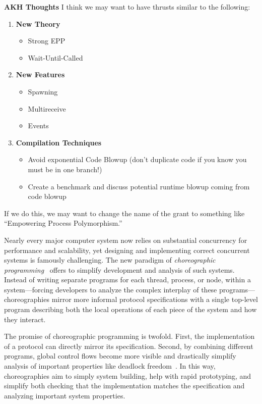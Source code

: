\noindent\textbf{AKH Thoughts}
I think we may want to have thrusts similar to the following:
\begin{enumerate}
\item \textbf{New Theory}
  \begin{itemize}
  \item Strong EPP
  \item Wait-Until-Called
  \end{itemize}
\item \textbf{New Features}
  \begin{itemize}
  \item Spawning
  \item Multireceive 
  \item Events
  \end{itemize}
\item \textbf{Compilation Techniques}
  \begin{itemize}
  \item Avoid exponential Code Blowup (don't duplicate code if you know you must be in one branch!)
  \item Create a benchmark and discuss potential runtime blowup coming from code blowup
  \end{itemize}
\end{enumerate}

If we do this, we may want to change the name of the grant to something like ``Empowering Process Polymorphism.''

\vspace{05em}

Nearly every major computer system now relies on substantial concurrency for performance and scalability,
yet designing and implementing correct concurrent systems is famously challenging.
The new paradigm of \emph{choreographic programming}~\citep{Montesi13,Montesi23} offers to simplify development and analysis of such systems.
Instead of writing separate programs for each thread, process, or node, within a system---forcing developers to analyze the complex interplay of these programs---%
choreographies mirror more informal protocol specifications with a single top-level program
describing both the local operations of each piece of the system and how they interact.

The promise of choreographic programming is twofold.
First, the implementation of a protocol can directly mirror its specification.
Second, by combining different programs, global control flows become more visible
and drastically simplify analysis of important properties like deadlock freedom~\citep{CarboneM13}.
In this way, choreographies aim to simply system building, help with rapid prototyping,
and simplify both checking that the implementation matches the specification
and analyzing important system properties.

